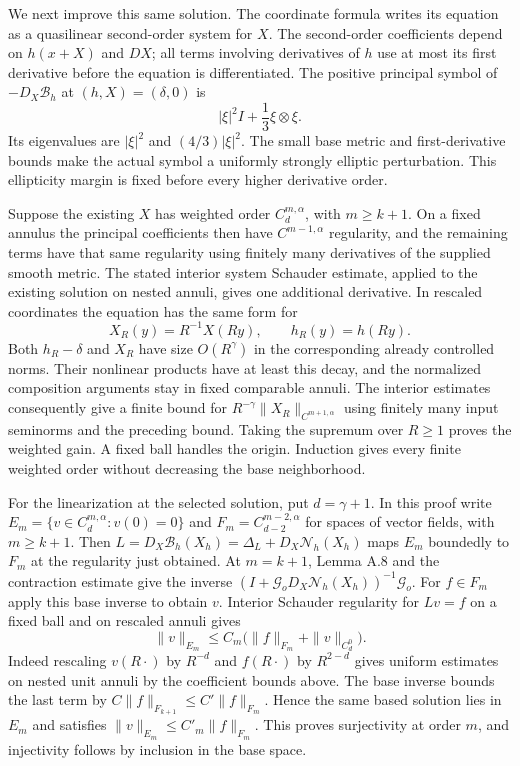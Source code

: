 \documentclass[
  english,
  11pt,
  reqno]{amsart}
\begin{document}
We next improve this same solution. The coordinate formula writes its
equation as a quasilinear second-order system for \(X\). The
second-order coefficients depend on \(h(x+X)\) and \(DX\); all terms
involving derivatives of \(h\) use at most its first derivative before
the equation is differentiated. The positive principal symbol of
\(-D_X\mathcal B_h\) at \((h,X)=(\delta,0)\) is \[
|\xi|^2I+\frac13\xi\otimes\xi.
\] Its eigenvalues are \(|\xi|^2\) and \((4/3)|\xi|^2\). The small base
metric and first-derivative bounds make the actual symbol a uniformly
strongly elliptic perturbation. This ellipticity margin is fixed before
every higher derivative order.

Suppose the existing \(X\) has weighted order \(C^{m,\alpha}_d\), with
\(m\ge k+1\). On a fixed annulus the principal coefficients then have
\(C^{m-1,\alpha}\) regularity, and the remaining terms have that same
regularity using finitely many derivatives of the supplied smooth
metric. The stated interior system Schauder estimate, applied to the
existing solution on nested annuli, gives one additional derivative. In
rescaled coordinates the equation has the same form for \[
X_R(y)=R^{-1}X(Ry),\qquad h_R(y)=h(Ry).
\] Both \(h_R-\delta\) and \(X_R\) have size \(O(R^\gamma)\) in the
corresponding already controlled norms. Their nonlinear products have at
least this decay, and the normalized composition arguments stay in fixed
comparable annuli. The interior estimates consequently give a finite
bound for \(R^{-\gamma}\|X_R\|_{C^{m+1,\alpha}}\) using finitely many
input seminorms and the preceding bound. Taking the supremum over
\(R\ge1\) proves the weighted gain. A fixed ball handles the origin.
Induction gives every finite weighted order without decreasing the base
neighborhood.

For the linearization at the selected solution, put \(d=\gamma+1\). In
this proof write \(E_m=\{v\in C_d^{m,\alpha}:v(0)=0\}\) and
\(F_m=C_{d-2}^{m-2,\alpha}\) for spaces of vector fields, with
\(m\ge k+1\). Then
\(L=D_X\mathcal B_h(X_h)=\Delta_L+D_X\mathcal N_h(X_h)\) maps \(E_m\)
boundedly to \(F_m\) at the regularity just obtained. At \(m=k+1\),
Lemma A.8 and the contraction estimate give the inverse
\((I+\mathcal G_o D_X\mathcal N_h(X_h))^{-1}\mathcal G_o\). For
\(f\in F_m\) apply this base inverse to obtain \(v\). Interior Schauder
regularity for \(Lv=f\) on a fixed ball and on rescaled annuli gives \[
\|v\|_{E_m}\le C_m\bigl(\|f\|_{F_m}+\|v\|_{C_d^0}\bigr).
\] Indeed rescaling \(v(R\cdot)\) by \(R^{-d}\) and \(f(R\cdot)\) by
\(R^{2-d}\) gives uniform estimates on nested unit annuli by the
coefficient bounds above. The base inverse bounds the last term by
\(C\|f\|_{F_{k+1}}\le C'\|f\|_{F_m}\). Hence the same based solution
lies in \(E_m\) and satisfies \(\|v\|_{E_m}\le C'_m\|f\|_{F_m}\). This
proves surjectivity at order \(m\), and injectivity follows by inclusion
in the base space.
\end{document}
